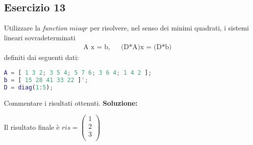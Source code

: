 \subsection{Esercizio 13}
Utilizzare la \textit{function} $miaqr$ per risolvere, nel senso dei minimi quadrati,
i sistemi lineari sovradeterminati
\begin{eqnarray*}
    \mbox{A x = b,} & & \mbox{(D*A)x = (D*b)}
\end{eqnarray*}
definiti dai seguenti dati:
\begin{lstlisting}[language=Matlab]
A = [ 1 3 2; 3 5 4; 5 7 6; 3 6 4; 1 4 2 ];
b = [ 15 28 41 33 22 ]';
D = diag(1:5);
\end{lstlisting}
Commentare i risultati ottenuti.
\newline \textbf{Soluzione:}

Il risultato finale è $ ris =\left(\begin{array}{c}
    1 \\
    2 \\
    3 \\
\end{array}\right)$  
